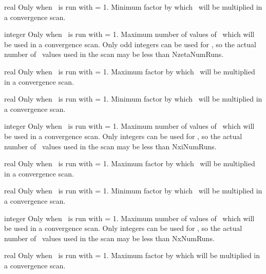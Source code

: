 \myhrule

{real}
{Only when \sfincsScan~is run with  = 1.}
{Minimum factor by which \Nzeta~will be multiplied in a convergence scan.}

\myhrule

{integer}
{Only when \sfincsScan~is run with  = 1.}
{Maximum number of values of \Nzeta~which will be used in a convergence scan.  Only odd integers can be used
for \Nzeta, so the actual number of \Nzeta~values used in the scan may be less than {\ttfamily NzetaNumRuns}.}

\myhrule

{real}
{Only when \sfincsScan~is run with  = 1.}
{Maximum factor by which \Nxi~will be multiplied in a convergence scan.}

\myhrule

{real}
{Only when \sfincsScan~is run with  = 1.}
{Minimum factor by which \Nxi~will be multiplied in a convergence scan.}

\myhrule

{integer}
{Only when \sfincsScan~is run with  = 1.}
{Maximum number of values of \Nxi~which will be used in a convergence scan.  Only integers can be used
for \Nxi, so the actual number of \Nxi~values used in the scan may be less than {\ttfamily NxiNumRuns}.}

\myhrule

{real}
{Only when \sfincsScan~is run with  = 1.}
{Maximum factor by which \Nx~will be multiplied in a convergence scan.}

\myhrule

{real}
{Only when \sfincsScan~is run with  = 1.}
{Minimum factor by which \Nx~will be multiplied in a convergence scan.}

\myhrule

{integer}
{Only when \sfincsScan~is run with  = 1.}
{Maximum number of values of \Nx~which will be used in a convergence scan.  Only integers can be used
for \Nx, so the actual number of \Nx~values used in the scan may be less than {\ttfamily NxNumRuns}.}

\myhrule

{real}
{Only when \sfincsScan~is run with  = 1.}
{Maximum factor by which  will be multiplied in a convergence scan.}

